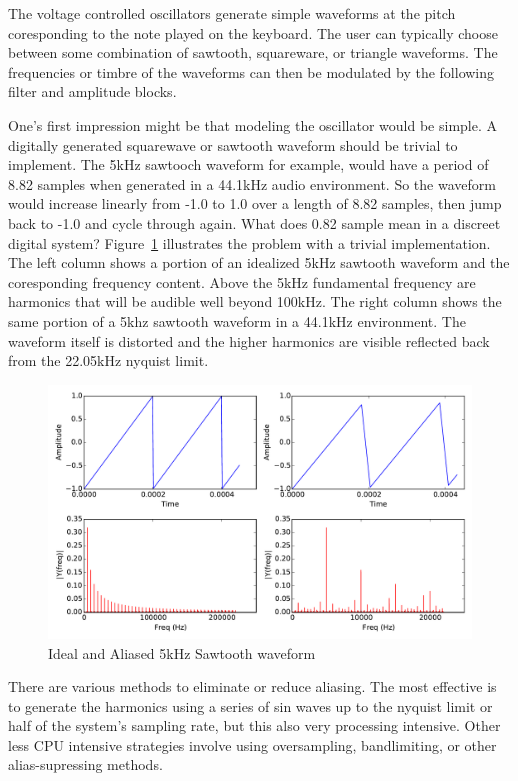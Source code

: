 The voltage controlled oscillators generate simple waveforms at the pitch coresponding to the note played on the keyboard. The user can typically choose between some combination of sawtooth, squareware, or triangle waveforms. The frequencies or timbre of the waveforms can then be modulated by the following filter and amplitude blocks.

One's first impression might be that modeling the oscillator would be simple. A digitally generated squarewave or sawtooth waveform should be trivial to implement. The 5kHz sawtooch waveform for example, would have a period of 8.82 samples when generated in a 44.1kHz audio environment. So the waveform would increase linearly from -1.0 to 1.0 over a length of 8.82 samples, then jump back to -1.0 and cycle through again. What does 0.82 sample mean in a discreet digital system? Figure~\ref{fig:aliasing_sawtooth} illustrates the problem with a trivial implementation. The left column shows a portion of an idealized 5kHz sawtooth waveform and the coresponding frequency content. Above the 5kHz fundamental frequency are harmonics that will be audible well beyond 100kHz. The right column shows the same portion of a 5khz sawtooth waveform in a 44.1kHz environment. The waveform itself is distorted and the higher harmonics are visible reflected back from the 22.05kHz nyquist limit.

\begin{figure}[h]
    \centering
    \includegraphics[width=\textwidth]{plots/graphics/sawtooth.pdf}
    \caption{Ideal and Aliased 5kHz Sawtooth waveform}
    \label{fig:aliasing_sawtooth}
\end{figure}

There are various methods to eliminate or reduce aliasing. The most effective is to generate the harmonics using a series of sin waves up to the nyquist limit or half of the system's sampling rate, but this also very processing intensive. Other less CPU intensive strategies involve using oversampling, bandlimiting, or other alias-supressing methods\cite{virtual_analog_synthesis}.

